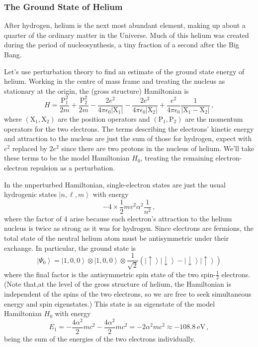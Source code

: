 \documentclass{article}
\theoremstyle{plain}\theoremheaderfont{\normalfont\itshape}\theorembodyfont{\rmfamily}\theoremseparator{.}\newtheorem*{rem}{Remark}\newtheorem*{ex}{Example}\newtheorem*{proof}{Proof}\newtheorem*{altp}{Alternative proof}
\theoremstyle{plain}\theoremheaderfont{\normalfont\bfseries}\theorembodyfont{\rmfamily}\theoremseparator{.}\newtheorem{thm}{Theorem}[section]\newtheorem{lem}[thm]{Lemma}\newtheorem{prop}[thm]{Proposition}\newtheorem*{cor}{Corollary}\newtheorem{defn}[thm]{Definition}\newtheorem{clm}[thm]{Claim}\newtheorem{clminproof}{Claim}
\theoremstyle{break}\theoremheaderfont{\normalfont\itshape}\theorembodyfont{\rmfamily}\theoremseparator{.\medskip}\newtheorem*{proofskip}{Proof}\newtheorem*{exs}{Examples}\newtheorem*{rems}{Remarks}
\theoremstyle{break}\theoremheaderfont{\normalfont\bfseries}\theorembodyfont{\rmfamily}\theoremseparator{.\medskip}\newtheorem{lemskip}[thm]{Lemma}\newtheorem{defnskip}[thm]{Definition}\newtheorem{propskip}[thm]{Proposition}\newtheorem{thmskip}[thm]{Theorem}
\numberwithin{equation}{section}
\newcommand{\unit}[1]{\ \mathrm{#1}}
\newcommand{\ket}[1]{\left| #1 \right\rangle}
\newcommand{\vb}[1]{\bm{\mathrm{#1}}}
\newcommand{\abs}[1]{\left| #1 \right|}
\begin{document}
    \subsubsection{The Ground State of Helium}
    After hydrogen, helium is the next most abundant element, making up about a quarter of the ordinary matter in the Universe. Much of this helium was created during the period of nucleosynthesis, a tiny fraction of a second after the Big Bang.

    Let's use perturbation theory to find an estimate of the ground state energy of helium. Working in the centre of mass frame and treating the nucleus as stationary at the origin, the (gross structure) Hamiltonian is
    \begin{equation}
        H=\frac{\vb{P}_1^2}{2m}+\frac{\vb{P}_2^2}{2m}-\frac{2e^2}{4\pi\epsilon_0\abs{\vb{X}_1}}-\frac{2e^2}{4\pi\epsilon_0\abs{\vb{X}_2}}+\frac{e^2}{4\pi\epsilon_0}\frac{1}{\abs{\vb{X}_1-\vb{X}_2}}\,,
    \end{equation}
    where \((\vb{X}_1,\vb{X}_2)\) are the position operators and \((\vb{P}_1,\vb{P}_2)\) are the momentum operators for the two electrons. The terms describing the electrons' kinetic energy and attraction to the nucleus are just the sum of those for hydrogen, expect with \(e^2\) replaced by \(2e^2\) since there are two protons in the nucleus of helium. We'll take these terms to be the model Hamiltonian \(H_0\), treating the remaining electron-electron repulsion as a perturbation.

    In the unperturbed Hamiltonian, single-electron states are just the usual hydrogenic states \(\ket{n,\ell,m}\) with energy
    \begin{equation}
        -4\times\frac{1}{2}mv^2\alpha^2\frac{1}{n^2}\,,
    \end{equation}
    where the factor of 4 arise because each electron's attraction to the helium nucleus is twice as strong as it was for hydrogen. Since electrons are fermions, the total state of the neutral helium atom must be antisymmetric under their exchange. In particular, the ground state is
    \begin{equation}
        \ket{\Psi_0}=\ket{1,0,0}\otimes\ket{1,0,0}\otimes\frac{1}{\sqrt{2}}\left(\ket{\uparrow}\ket{\downarrow}-\ket{\downarrow}\ket{\uparrow}\right)
    \end{equation}
    where the final factor is the antisymmetric spin state of the two spin-\(\frac{1}{2}\) electrons.  (Note that,at the level of the gross structure of helium, the Hamiltonian is independent of the spins of the two electrons, so we are free to seek simultaneous energy and spin eigenstates.) This state is an eigenstate of the model Hamiltonian \(H_0\) with energy
    \begin{equation}
        E_1=-\frac{4\alpha^2}{2}mc^2-\frac{4\alpha^2}{2}mc^2=-2\alpha^2 mc^2\approx -108.8\unit{eV}\,,
    \end{equation}
    being the sum of the energies of the two electrons individually.
\end{document}
